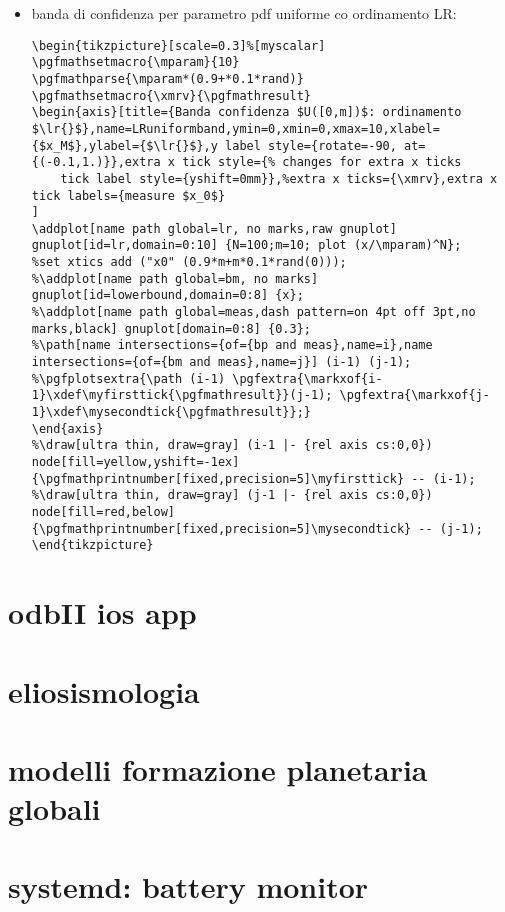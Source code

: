 \begin{itemize}
\begin{verbatim}
\begin{frame}{Costruzione Neyman per pdf uniforme}
\begin{tikzpicture}[scale=1.5]
\begin{axis}[
%view       = {-5}{-5},
axis lines = middle,
xlabel=$x_M$, ylabel=$m$, zlabel=$\prob{(x_M;m)}$
]
\addplot3 [surf,
opacity=0.1
] gnuplot[id=xMband,raw gnuplot,surf] {N=20; f(x,y)=(x>y) ? 1/0:(N/y)*(x/y)^(N-1); splot [1:10][1:10] ((N/y)*(x/y)^(N-1))};
\end{axis}
\end{tikzpicture}
\end{frame}
\end{verbatim}
\item banda di confidenza per parametro pdf uniforme co ordinamento LR:
\begin{verbatim}
\begin{tikzpicture}[scale=0.3]%[myscalar]
\pgfmathsetmacro{\mparam}{10}
\pgfmathparse{\mparam*(0.9+*0.1*rand)}
\pgfmathsetmacro{\xmrv}{\pgfmathresult}
\begin{axis}[title={Banda confidenza $U([0,m])$: ordinamento $\lr{}$},name=LRuniformband,ymin=0,xmin=0,xmax=10,xlabel={$x_M$},ylabel={$\lr{}$},y label style={rotate=-90, at={(-0.1,1.)}},extra x tick style={% changes for extra x ticks
	tick label style={yshift=0mm}},%extra x ticks={\xmrv},extra x tick labels={measure $x_0$}
]
\addplot[name path global=lr, no marks,raw gnuplot] gnuplot[id=lr,domain=0:10] {N=100;m=10; plot (x/\mparam)^N};
%set xtics add ("x0" (0.9*m+m*0.1*rand(0)));
%\addplot[name path global=bm, no marks] gnuplot[id=lowerbound,domain=0:8] {x};
%\addplot[name path global=meas,dash pattern=on 4pt off 3pt,no marks,black] gnuplot[domain=0:8] {0.3};
%\path[name intersections={of={bp and meas},name=i},name intersections={of={bm and meas},name=j}] (i-1) (j-1);
%\pgfplotsextra{\path (i-1) \pgfextra{\markxof{i-1}\xdef\myfirsttick{\pgfmathresult}}(j-1); \pgfextra{\markxof{j-1}\xdef\mysecondtick{\pgfmathresult}};}
\end{axis}
%\draw[ultra thin, draw=gray] (i-1 |- {rel axis cs:0,0}) node[fill=yellow,yshift=-1ex]{\pgfmathprintnumber[fixed,precision=5]\myfirsttick} -- (i-1);
%\draw[ultra thin, draw=gray] (j-1 |- {rel axis cs:0,0}) node[fill=red,below]{\pgfmathprintnumber[fixed,precision=5]\mysecondtick} -- (j-1);
\end{tikzpicture}
\end{verbatim}
\end{itemize}

\section{odbII ios app}

\section{eliosismologia}

\section{modelli formazione planetaria globali}

\section{systemd: battery monitor}